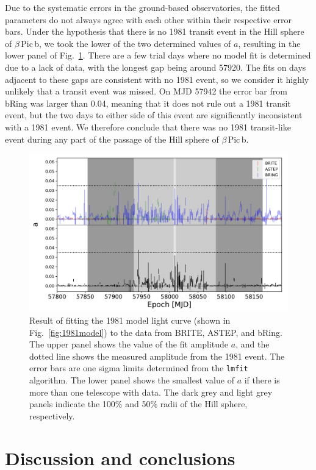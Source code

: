 \documentclass[longauth]{aa} %
\newcommand{\bpb}{$\beta$\,Pic\,b}
\begin{document}
Due to the systematic errors in the ground-based observatories, the fitted parameters do not always agree with each other within their respective error bars.
%
Under the hypothesis that there is no 1981 transit event in the Hill sphere of \bpb,{} we took the lower of the two determined values of $a$, resulting in the lower panel of Fig.~\ref{fig:1981fit}.
%
There are a few trial days where no model fit is determined due to a lack of data, with the longest gap being around 57920.
%
The fits on days adjacent to these gaps are consistent with no 1981 event, so we consider it highly unlikely that a transit event was missed.
%
On MJD 57942 the error bar from bRing was larger than 0.04, meaning that it does not rule out a 1981 transit event, but the two days to either side of this event are significantly inconsistent with a 1981 event.
%
We therefore conclude that there was no 1981 transit-like event during any part of the passage of the Hill sphere of \bpb{}.

\begin{figure}[htb]
\centering
\includegraphics[width=0.9\linewidth]{fit_to_1981_model.pdf}
\caption{Result of fitting the 1981 model light curve (shown in Fig.~\ref{fig:1981model}) to the data from BRITE, ASTEP, and bRing. The upper panel shows the value of the fit amplitude $a$, and the dotted line shows the measured amplitude from the 1981 event. The error bars are one sigma limits determined from the {\tt lmfit} algorithm. The lower panel shows the smallest value of $a$ if there is more than one telescope with data. The dark grey and light grey panels indicate the 100\% and 50\% radii of the Hill sphere, respectively.}
\label{fig:1981fit}
\end{figure}

\section{Discussion and conclusions }\label{sec:concl}
\end{document}
